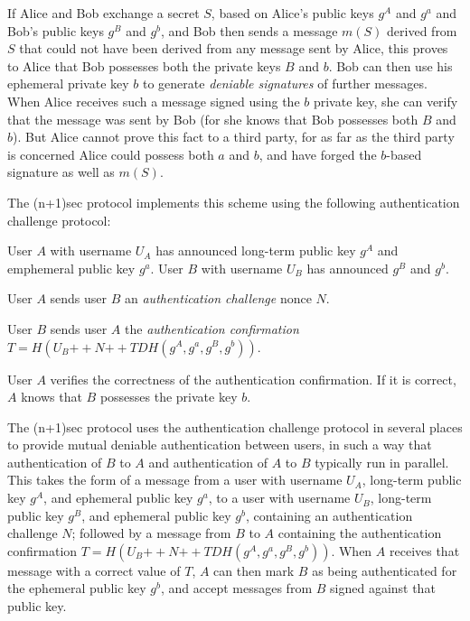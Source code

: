 \documentclass{article}
\def\concat{\mathbin{+\!\!\!+}}
\begin{document}
If Alice and Bob exchange a secret $S$, based on Alice's public keys $g^A$ and $g^a$ and Bob's public keys $g^B$ and $g^b$, and Bob then sends a message $m(S)$ derived from $S$ that could not have been derived from any message sent by Alice, this proves to Alice that Bob possesses both the private keys $B$ and $b$.
Bob can then use his ephemeral private key $b$ to generate \emph{deniable signatures} of further messages.
When Alice receives such a message signed using the $b$ private key, she can verify that the message was sent by Bob (for she knows that Bob possesses both $B$ and $b$).
But Alice cannot prove this fact to a third party, for as far as the third party is concerned Alice could possess both $a$ and $b$, and have forged the $b$-based signature as well as $m(S)$.

The (n+1)sec protocol implements this scheme using the following authentication challenge protocol:
\begin{description}[noitemsep]
\item[Participants.] User $A$ with username $U_A$ has announced long-term public key $g^A$ and emphemeral public key $g^a$. User $B$ with username $U_B$ has announced $g^B$ and $g^b$.
\item[Round 1.] User $A$ sends user $B$ an \emph{authentication challenge} nonce $N$.
\item[Round 2.] User $B$ sends user $A$ the \emph{authentication confirmation} $T = H(U_B \concat N \concat TDH(g^A, g^a, g^B, g^b))$.
\item[Computation.] User $A$ verifies the correctness of the authentication confirmation. If it is correct, $A$ knows that $B$ possesses the private key $b$.
\end{description}

The (n+1)sec protocol uses the authentication challenge protocol in several places to provide mutual deniable authentication between users, in such a way that authentication of $B$ to $A$ and authentication of $A$ to $B$ typically run in parallel.
This takes the form of a message from a user with username $U_A$, long-term public key $g^A$, and ephemeral public key $g^a$, to a user with username $U_B$, long-term public key $g^B$, and ephemeral public key $g^b$, containing an authentication challenge $N$; followed by a message from $B$ to $A$ containing the authentication confirmation $T = H(U_B \concat N \concat TDH(g^A, g^a, g^B, g^b))$.
When $A$ receives that message with a correct value of $T$, $A$ can then mark $B$ as being authenticated for the ephemeral public key $g^b$, and accept messages from $B$ signed against that public key.
\end{document}
